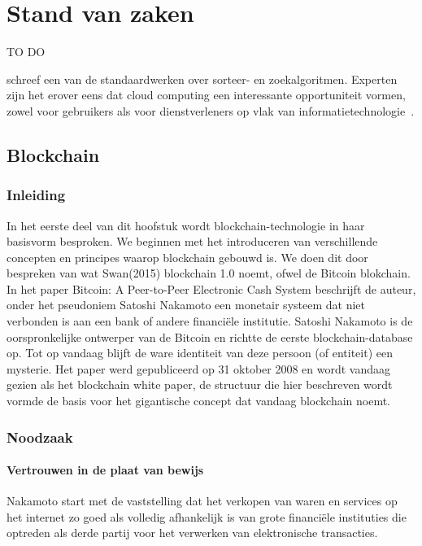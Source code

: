 \chapter{Stand van zaken}
\label{ch:stand-van-zaken}



TO DO

\textcite{Knuth1998} schreef een van de standaardwerken over sorteer- en zoekalgoritmen. Experten zijn het erover eens dat cloud computing een interessante opportuniteit vormen, zowel voor gebruikers als voor dienstverleners op vlak van informatietechnologie~\autocite{Creeger2009}.
\newpage
\section{Blockchain}
\label{sec:blockchain}
	\subsection*{Inleiding}
	In het eerste deel van dit hoofstuk wordt blockchain-technologie in haar basisvorm besproken. We beginnen met het introduceren  van  verschillende concepten en principes waarop blockchain gebouwd is.  We doen dit door bespreken van wat Swan(2015) blockchain 1.0 noemt, ofwel de Bitcoin blokchain. In het paper Bitcoin: A Peer-to-Peer Electronic Cash System beschrijft de auteur, onder het pseudoniem Satoshi Nakamoto een monetair systeem dat niet verbonden is aan een bank of  andere financiële institutie. Satoshi Nakamoto is de oorspronkelijke ontwerper van de Bitcoin en richtte de eerste blockchain-database op. Tot op vandaag blijft de ware identiteit van deze persoon (of entiteit) een mysterie. Het paper werd gepubliceerd op 31 oktober 2008 en wordt vandaag gezien als het blockchain white paper,  de structuur die hier beschreven wordt vormde de basis voor het gigantische concept dat vandaag blockchain noemt.
	\subsection{Noodzaak}
			\subsubsection{Vertrouwen in de plaat van bewijs}
			Nakamoto start met de vaststelling dat het verkopen van waren en services op het internet zo goed als volledig afhankelijk is van grote financiële instituties die optreden als derde partij voor het verwerken van elektronische transacties. 
		

